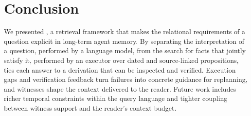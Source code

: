 \section{Conclusion}
\label{sec:conclusion}

We presented \sys, a retrieval framework that makes the relational
requirements of a question explicit in long-term agent memory. By
separating the interpretation of a question, performed by a language
model, from the search for facts that jointly satisfy it, performed by
an executor over dated and source-linked propositions, \sys ties each
answer to a derivation that can be inspected and verified. Execution
gaps and verification feedback turn failures into concrete guidance for
replanning, and witnesses shape the context delivered to the reader.
Future work includes richer temporal constraints within the query
language and tighter coupling between witness support and the reader's
context budget.

